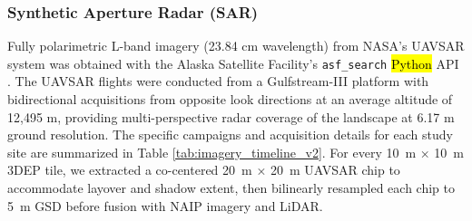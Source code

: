 \documentclass[remotesensing,article,accept,pdftex,moreauthors]{Definitions/mdpi}
\begin{document}
\subsubsection{Synthetic Aperture Radar (SAR)}
Fully polarimetric L-band imagery (23.84 cm wavelength) from NASA’s UAVSAR system was obtained with the Alaska Satellite Facility’s \texttt{asf\_search} \hl{Python} %
 API \citep{alaska_search}. The UAVSAR flights were conducted from a Gulfstream-III platform with bidirectional acquisitions from opposite look directions at an average altitude of 12,495 m, providing multi-perspective radar coverage of the landscape at 6.17 m ground resolution. The specific campaigns and acquisition details for each study site are summarized in Table \ref{tab:imagery_timeline_v2}. For every \SI{10}{m} × \SI{10}{m} 3DEP tile, we extracted a co-centered \SI{20}{m} × \SI{20}{m} UAVSAR chip to accommodate layover and shadow extent, then bilinearly resampled each chip to \SI{5}{m} GSD before fusion with NAIP imagery and LiDAR. 
\end{document}
